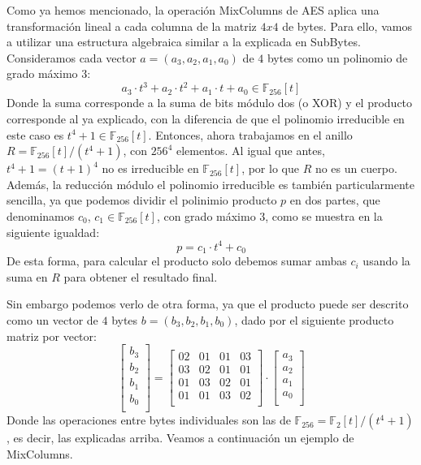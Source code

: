     Como ya hemos mencionado, la operación MixColumns de AES aplica una transformación lineal a cada columna de la matriz $4x4$ de bytes. Para ello, vamos a utilizar una estructura algebraica similar a la explicada en SubBytes. Consideramos cada vector $a = (a_{3}, a_{2}, a_{1}, a_{0})$ de $4$ bytes como un polinomio de grado máximo $3$:
    \begin{equation}
        a_{3} \cdot t^{3} + a_{2} \cdot t^{2} + a_{1} \cdot t + a_{0} \in \mathbb{F}_{256}[t]
    \end{equation}
    Donde la suma corresponde a la suma de bits módulo dos (o XOR) y el producto corresponde al ya explicado, con la diferencia de que el polinomio irreducible en este caso es $t^{4} + 1 \in \mathbb{F}_{256}[t]$. Entonces, ahora trabajamos en el anillo $R = \mathbb{F}_{256}[t]/(t^{4} + 1)$, con $256^{4}$ elementos. Al igual que antes, $t^{4} + 1 = (t + 1)^{4}$ no es irreducible en $\mathbb{F}_{256}[t]$, por lo que $R$ no es un cuerpo. Además, la reducción módulo el polinomio irreducible es también particularmente sencilla, ya que podemos dividir el polinimio producto $p$ en dos partes, que denominamos $c_{0}$, $c_{1} \in \mathbb{F}_{256}[t]$, con grado máximo $3$, como se muestra en la siguiente igualdad:
    \begin{equation}
        p = c_{1} \cdot t^{4} + c_{0}
    \end{equation}
    De esta forma, para calcular el producto solo debemos sumar ambas $c_{i}$ usando la suma en $R$ para obtener el resultado final.

    Sin embargo podemos verlo de otra forma, ya que el producto puede ser descrito como un vector de $4$ bytes $b = (b_{3}, b_{2}, b_{1}, b_{0})$, dado por el siguiente producto matriz por vector:
    \begin{equation}
        \begin{bmatrix}
                b_{3} \\
                b_{2} \\
                b_{1} \\
                b_{0} \\
        \end{bmatrix}
        =
        \begin{bmatrix}
                02 & 01 & 01 & 03 \\
                03 & 02 & 01 & 01 \\
                01 & 03 & 02 & 01 \\
                01 & 01 & 03 & 02 \\
        \end{bmatrix}
        \cdot
        \begin{bmatrix}
                a_{3} \\
                a_{2} \\
                a_{1} \\
                a_{0} \\
        \end{bmatrix}
    \end{equation}
    Donde las operaciones entre bytes individuales son las de $\mathbb{F}_{256} = \mathbb{F}_{2}[t]/(t^{4} + 1)$, es decir, las explicadas arriba. Veamos a continuación un ejemplo de MixColumns.

